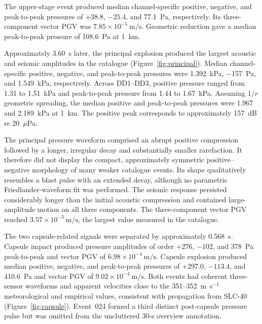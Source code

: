 \documentclass[]{seismica}
\begin{document}
The upper-stage event produced median channel-specific positive, negative, and
peak-to-peak pressures of +38.8, $-25.4$, and 77.1~Pa, respectively. Its
three-component vector PGV was
$7.85\times10^{-5}\ \si{\metre\per\second}$. Geometric reduction gave a
median peak-to-peak pressure of 108.6~Pa at 1~km.

Approximately \SI{3.60}{\second} later, the principal explosion produced the
largest acoustic and seismic amplitudes in the catalogue
(Figure~\ref{fig:principal}). Median channel-specific positive, negative, and
peak-to-peak pressures were \SI{1.392}{\kilo\pascal},
\SI{-157}{\pascal}, and \SI{1.549}{\kilo\pascal}, respectively. Across
DD1--DD3, positive pressure ranged from 1.31 to 1.51~kPa and peak-to-peak
pressure from 1.44 to 1.67~kPa. Assuming $1/r$ geometric spreading, the median
positive and peak-to-peak pressures were 1.967 and 2.189~kPa at 1~km. The
positive peak corresponds to approximately 157~dB re 20~$\mu$Pa.

The principal pressure waveform comprised an abrupt positive compression
followed by a longer, irregular decay and substantially smaller rarefaction. It
therefore did not display the compact, approximately symmetric positive--negative
morphology of many weaker catalogue events. Its shape qualitatively resembles a
blast pulse with an extended decay, although no parametric Friedlander-waveform
fit was performed. The seismic response persisted considerably longer than the
initial acoustic compression and contained large-amplitude motion on all three
components. The three-component vector PGV reached
$3.57\times10^{-3}\ \si{\metre\per\second}$, the largest value measured in the
catalogue.

The two capsule-related signals were separated by approximately
\SI{0.568}{\second}. Capsule impact produced pressure amplitudes of order
$+276$, $-102$, and 378~Pa peak-to-peak and vector PGV of
$6.98\times10^{-4}\ \si{\metre\per\second}$. Capsule explosion produced
median positive, negative, and peak-to-peak pressures of +297.0, $-113.4$,
and 410.6~Pa and vector PGV of
$9.02\times10^{-4}\ \si{\metre\per\second}$. Both events had coherent
three-sensor waveforms and apparent velocities close to the 351--352~m~s$^{-1}$
meteorological and empirical values, consistent with propagation from SLC-40
(Figure~\ref{fig:capsule}). Event~024 formed a third distinct
post-capsule pressure pulse but was omitted from the uncluttered 30-s overview
annotation.
\end{document}
